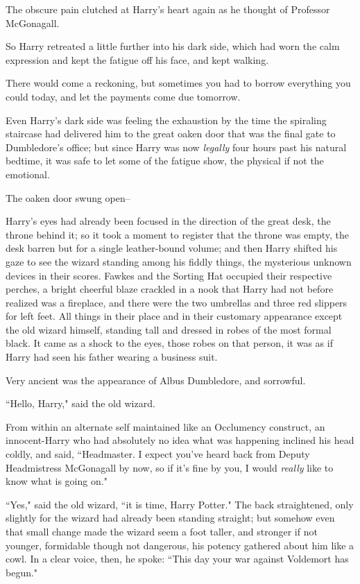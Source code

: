The obscure pain clutched at Harry's heart again as he thought of Professor McGonagall.

So Harry retreated a little further into his dark side, which had worn the calm expression and kept the fatigue off his face, and kept walking.

There would come a reckoning, but sometimes you had to borrow everything you could today, and let the payments come due tomorrow.

\later

Even Harry's dark side was feeling the exhaustion by the time the spiraling staircase had delivered him to the great oaken door that was the final gate to Dumbledore's office; but since Harry was now \emph{legally} four hours past his natural bedtime, it was safe to let some of the fatigue show, the physical if not the emotional.

The oaken door swung open\---

Harry's eyes had already been focused in the direction of the great desk, the throne behind it; so it took a moment to register that the throne was empty, the desk barren but for a single leather-bound volume; and then Harry shifted his gaze to see the wizard standing among his fiddly things, the mysterious unknown devices in their scores. Fawkes and the Sorting Hat occupied their respective perches, a bright cheerful blaze crackled in a nook that Harry had not before realized was a fireplace, and there were the two umbrellas and three red slippers for left feet. All things in their place and in their customary appearance except the old wizard himself, standing tall and dressed in robes of the most formal black. It came as a shock to the eyes, those robes on that person, it was as if Harry had seen his father wearing a business suit.

Very ancient was the appearance of Albus Dumbledore, and sorrowful.

``Hello, Harry," said the old wizard.

From within an alternate self maintained like an Occlumency construct, an innocent-Harry who had absolutely no idea what was happening inclined his head coldly, and said, ``Headmaster. I expect you've heard back from Deputy Headmistress McGonagall by now, so if it's fine by you, I would \emph{really} like to know what is going on."

``Yes," said the old wizard, ``it is time, Harry Potter." The back straightened, only slightly for the wizard had already been standing straight; but somehow even that small change made the wizard seem a foot taller, and stronger if not younger, formidable though not dangerous, his potency gathered about him like a cowl. In a clear voice, then, he spoke: ``This day your war against Voldemort has begun."

